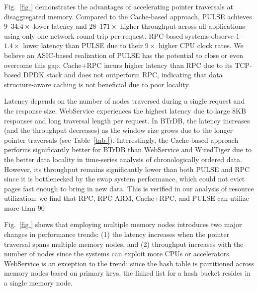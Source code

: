  Fig.~\ref{fig
} demonstrates the advantages of accelerating pointer traversals at disaggregated memory. Compared to the Cache-based approach, PULSE achieves $9$--$34.4\times$ lower latency and $28$--$171\times$ higher throughput across all applications using only one network round-trip per request. RPC-based systems observe $1$--$1.4\times$ lower latency than PULSE due to their $9\times$ higher CPU clock rates. We believe an ASIC-based realization of PULSE has the potential to close or even overcome this gap. Cache+RPC incurs higher latency than RPC due to its TCP-based DPDK stack and does not outperform RPC, indicating that data structure-aware caching is not beneficial due to poor locality.

Latency depends on the number of nodes traversed during a single request and the response size. WebService experiences the highest latency due to large 8KB responses and long traversal length per request. In BTrDB, the latency increases (and the throughput decreases) as the window size grows due to the longer pointer traversals (see Table~\ref{tab
}). Interestingly, the Cache-based approach performs significantly better for BTrDB than WebService and WiredTiger due to the better data locality in time-series analysis of chronologically ordered data. However, its throughput remains significantly lower than both PULSE and RPC since it is bottlenecked by the swap system performance, which could not evict pages fast enough to bring in new data. This is verified in our analysis of resource utilization; we find that RPC, RPC-ARM, Cache+RPC, and PULSE can utilize more than 90%

 Fig.~\ref{fig
} shows that employing multiple memory nodes introduces two major changes in performance trends: (1) the latency increases when the pointer traversal spans multiple memory nodes, and (2) throughput increases with the number of nodes since the systems can exploit more CPUs or accelerators. WebService is an exception to the trend: since the hash table is partitioned across memory nodes based on primary keys, the linked list for a hash bucket resides in a single memory node.

